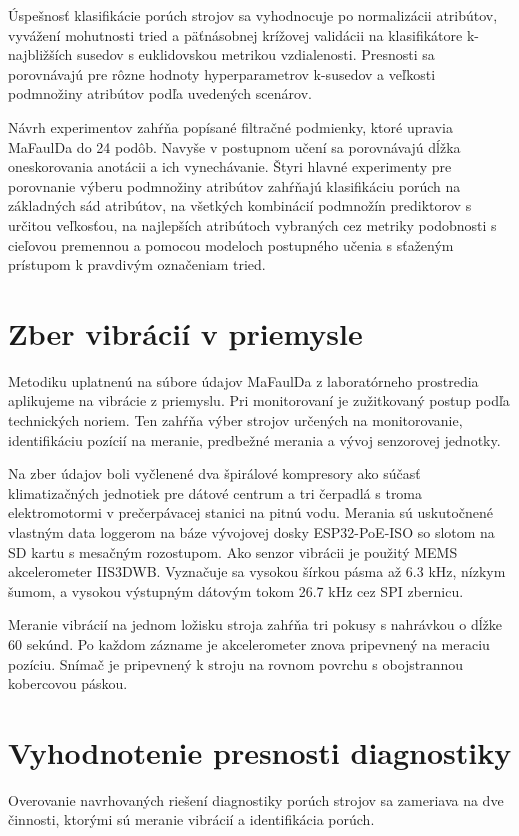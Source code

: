 Úspešnosť klasifikácie porúch strojov sa vyhodnocuje po normalizácii atribútov, vyvážení mohutnosti tried a päťnásobnej krížovej validácii na klasifikátore k-najbližších susedov s euklidovskou metrikou vzdialenosti. Presnosti sa porovnávajú pre rôzne hodnoty hyperparametrov k-susedov a veľkosti podmnožiny atribútov podľa uvedených scenárov.

Návrh experimentov zahŕňa popísané filtračné podmienky, ktoré upravia MaFaulDa do 24 podôb. Navyše v postupnom učení sa porovnávajú dĺžka oneskorovania anotácii a ich vynechávanie. Štyri hlavné experimenty pre porovnanie výberu podmnožiny atribútov zahŕňajú klasifikáciu porúch na základných sád atribútov, na všetkých kombinácií podmnožín prediktorov s určitou veľkosťou, na najlepších atribútoch vybraných cez metriky podobnosti s cieľovou premennou a pomocou modeloch postupného učenia s sťaženým prístupom k pravdivým označeniam tried.  

\section{Zber vibrácií v priemysle}
Metodiku uplatnenú na súbore údajov MaFaulDa z laboratórneho prostredia aplikujeme na vibrácie z priemyslu. Pri monitorovaní je zužitkovaný postup podľa technických noriem. Ten zahŕňa výber strojov určených na monitorovanie, identifikáciu pozícií na meranie, predbežné merania a vývoj senzorovej jednotky. 

Na zber údajov boli vyčlenené dva špirálové kompresory ako súčasť klimatizačných jednotiek pre dátové centrum a tri čerpadlá s troma elektromotormi v prečerpávacej stanici na pitnú vodu. Merania sú uskutočnené vlastným data loggerom na báze vývojovej dosky ESP32-PoE-ISO so slotom na SD kartu s mesačným rozostupom. Ako senzor vibrácii je použitý MEMS akcelerometer IIS3DWB. Vyznačuje sa vysokou šírkou pásma až 6.3 kHz, nízkym šumom, a vysokou výstupným dátovým tokom 26.7 kHz cez SPI zbernicu. 

Meranie vibrácií na jednom ložisku stroja zahŕňa tri pokusy s nahrávkou o dĺžke 60 sekúnd. Po každom zázname je akcelerometer znova pripevnený na meraciu pozíciu. Snímač je pripevnený k stroju na rovnom povrchu s obojstrannou kobercovou páskou.

\section{Vyhodnotenie presnosti diagnostiky}
Overovanie navrhovaných riešení diagnostiky porúch strojov sa zameriava na dve činnosti, ktorými sú meranie vibrácií a identifikácia porúch.

